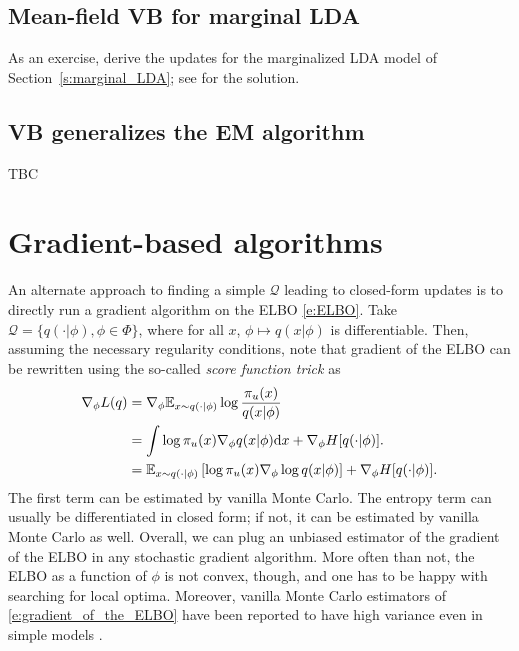\subsection{Mean-field VB for marginal LDA}
As an exercise, derive the updates for the marginalized LDA model of Section~\ref{s:marginal_LDA}; see \cite[Chapter 27.3]{Mur12} for the solution.

\subsection{VB generalizes the EM algorithm}
TBC

\section{Gradient-based algorithms}
An alternate approach to finding a simple $\mathcal Q$ leading to closed-form updates is to directly run a gradient algorithm on the ELBO \eqref{e:ELBO}.
Take $\mathcal{Q} = \{q(\cdot\vert\phi), \phi \in\Phi\}$, where for all $x$, $\phi\mapsto q(x\vert\phi)$ is differentiable.
Then, assuming the necessary regularity conditions, \cite{PaBlJo12} note that gradient of the ELBO can be rewritten using the so-called \emph{score function trick} as
\begin{align*}
\nabla_\phi L(q) 
&= \nabla_\phi \mathbb{E}_{x\sim q(\cdot\vert\phi)} \log \frac{\pi_u(x)}{q(x\vert\phi)}\\
&= \int \log \pi_u(x) \nabla_\phi q(x\vert\phi) \mathrm{d} x + \nabla_\phi H[q(\cdot\vert\phi)].\\
&= \mathbb E_{{x\sim q(\cdot\vert\phi)}} \left [\log \pi_u(x) \nabla_\phi \log q(x\vert\phi) \right ] + \nabla_\phi H[q(\cdot\vert\phi)].
\end{align*}
The first term can be estimated by vanilla Monte Carlo. 
The entropy term can usually be differentiated in closed form; if not, it can be estimated by vanilla Monte Carlo as well. 
Overall, we can plug an unbiased estimator of the gradient of the ELBO in any stochastic gradient algorithm. 
More often than not, the ELBO as a function of $\phi$ is not convex, though, and one has to be happy with searching for local optima. 
Moreover, vanilla Monte Carlo estimators of \eqref{e:gradient_of_the_ELBO} have been reported to have high variance even in simple models \cite{PaBlJo12}. 

